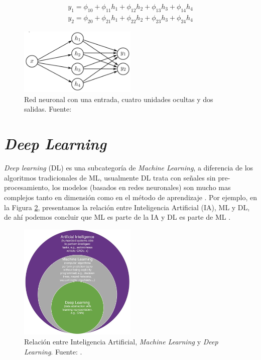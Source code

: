 \begin{equation}\label{equa:ml_2}	
	\begin{split}
		y_1 = \phi_{10} + \phi_{11}h_1  + \phi_{12}h_2 + \phi_{13}h_3 + \phi_{14}h_4 \\
		y_2 = \phi_{20} + \phi_{21}h_1  + \phi_{22}h_2 + \phi_{23}h_3 + \phi_{24}h_4
	\end{split}
\end{equation}	

\begin{figure}[H]
	\centering
	\includegraphics[width=0.5\textwidth]{../img/theory/shallow}
	\caption{Red neuronal con una entrada, cuatro unidades ocultas y dos salidas. Fuente: \cite{prince2023understanding} }
	\label{fig:shallow}
\end{figure}

\section{\textit{Deep Learning}}

\textit{Deep learning} (DL) es una subcategoría de \textit{Machine Learning}, a diferencia de los algoritmos tradicionales de ML, usualmente DL trata con señales sin pre-procesamiento, los modelos (basados en redes neuronales) son mucho mas complejos tanto en dimensión como en el método de aprendizaje \citep{el2022machine}. Por ejemplo, en la Figura \ref{fig:dl}, presentamos la relación entre Inteligencia Artificial (IA), ML y DL, de ahí podemos concluir que ML es parte de la IA y DL es parte de ML \citep{el2022machine}.

\begin{figure}[H]
	\centering
	\includegraphics[width=0.5\textwidth]{../img/neoantigen/dl}
	\caption{Relación entre Inteligencia Artificial, \textit{Machine Learning} y \textit{Deep Learning}. Fuente: \cite{el2022machine}.}
	\label{fig:dl}
\end{figure}

